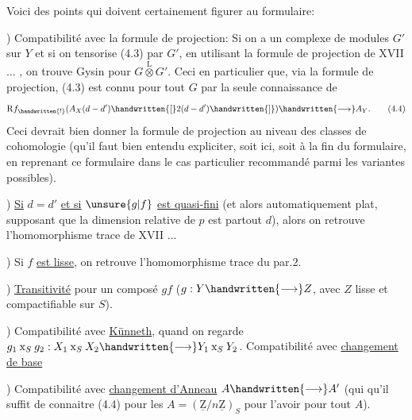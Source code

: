 Voici des points qui doivent certainement figurer au formulaire:

) Compatibilité avec la formule de projection: Si on a un complexe de modules $G'$ sur $Y$ et si on tensorise (4.3) par $G'$, en utilisant la formule de projection de XVII ... , on trouve Gysin pour $G\overset{\mathrm{L}}{\otimes}G'$. Ceci  en particulier que, via la formule de projection,
(4.3) est connu pour tout $G$ par la seule connaissance de
\[
\mathrm{R}f_{\handwritten{!}}(A_X(d-d')\handwritten{[}2(d-d')\handwritten{]})\handwritten{\longrightarrow}A_Y.
\tag*{(4.4)}
\]
Ceci devrait bien donner la formule de projection au niveau des classes de cohomologie (qu'il faut bien entendu expliciter, soit ici, soit à la fin du formulaire, en reprenant ce formulaire dans  le cas particulier recommandé\handwritten{,} parmi les variantes possibles).

) \uline{Si} $d=d'$ \uline{et si} $\unsure{g|f}$ \uline{est quasi-fini} (et alors automatiquement plat, supposant que la dimension relative de $p$ est partout $d$), alors on retrouve l'homomorphisme trace de XVII ...

) Si $f$ \uline{est lisse}, on retrouve l'homomorphisme trace du par.2.

) \uline{Transitivité} pour un composé $gf$ ($g:Y\handwritten{\longrightarrow}Z$, avec $Z$ lisse et compactifiable sur $S$).

) Compatibilité avec \uline{Künneth}, quand on regarde $g_1\mathbin{\mathrm{x}}_S g_2:X_1\mathbin{\mathrm{x}}_S X_2\handwritten{\longrightarrow}Y_1\mathbin{\mathrm{x}}_S Y_2$. Compatibilité avec \uline{changement de base}

) Compatibilité avec \uline{changement d'Anneau} $A\handwritten{\longrightarrow}A'$ (qui  qu'il suffit de connaitre (4.4) pour les $A=(\underline{\mathrm{Z}}/n\underline{\mathrm{Z}})_S$ pour l'avoir pour tout $A$).

